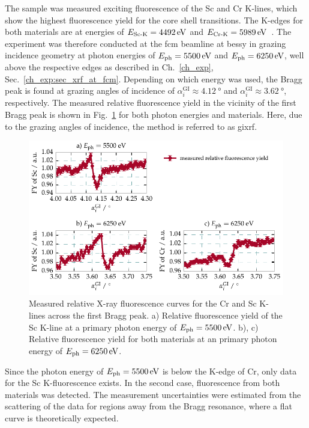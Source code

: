 The sample was measured exciting fluorescence of the Sc and Cr K-lines, which show the highest fluorescence yield for the core shell transitions. The K-edges for both materials are at energies of $E_\text{Sc-K} = \ev{4492}$ and $E_\text{Cr-K} = \ev{5989}$~\cite{elam_new_2002}. The experiment was therefore conducted at the \gls{fcm} beamline at \gls{bessy} in grazing incidence geometry at photon energies of $E_\text{ph} = \ev{5500}$ and $E_\text{ph} = \ev{6250}$, well above the respective edges as described in Ch.~\ref{ch_exp}, Sec.~\ref{ch_exp:sec_xrf_at_fcm}. Depending on which energy was used, the Bragg peak is found at grazing angles of incidence of $\alpha_i^\text{GI} \approx \SI{4.12}{\degree}$ and $\alpha_i^\text{GI} \approx \SI{3.62}{\degree}$, respectively. The measured relative fluorescence yield in the vicinity of the first Bragg peak is shown in Fig.~\ref{ch_spec:fig_CrSc_fluorescence_data} for both photon energies and materials. Here, due to the grazing angles of incidence, the method is referred to as \gls{gixrf}.
\begin{figure}[htbp]
  \centering
  \includegraphics[width=\textwidth]{img/CrSc_fluorescence_data}
  \caption[Measured relative X-ray fluorescence curves for the Cr and Sc K-lines across the first Bragg peak of the Cr/Sc sample.]{Measured relative X-ray fluorescence curves for the Cr and Sc K-lines across the first Bragg peak. a) Relative fluorescence yield of the Sc K-line at a primary photon energy of $E_\text{ph}=\ev{5500}$. b), c) Relative fluorescence yield for both materials at an primary photon energy of $E_\text{ph} = \ev{6250}$.}
  \label{ch_spec:fig_CrSc_fluorescence_data}
\end{figure}
Since the photon energy of $E_\text{ph} = \ev{5500}$ is below the K-edge of Cr, only data for the Sc K-fluorescence exists. In the second case, fluorescence from both materials was detected. The measurement uncertainties were estimated from the scattering of the data for regions away from the Bragg resonance, where a flat curve is theoretically expected.

